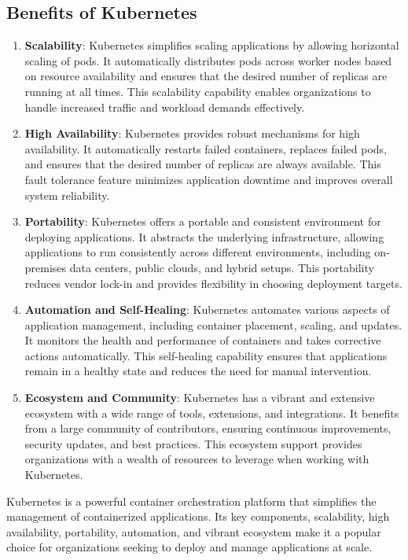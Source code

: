 \subsection*{Benefits of Kubernetes}
\begin{enumerate}

    \item \textbf{Scalability}: Kubernetes simplifies scaling applications by allowing horizontal scaling of pods. It automatically distributes pods across worker nodes based on resource availability and ensures that the desired number of replicas are running at all times. This scalability capability enables organizations to handle increased traffic and workload demands effectively.

    \item \textbf{High Availability}: Kubernetes provides robust mechanisms for high availability. It automatically restarts failed containers, replaces failed pods, and ensures that the desired number of replicas are always available. This fault tolerance feature minimizes application downtime and improves overall system reliability.

    \item \textbf{Portability}: Kubernetes offers a portable and consistent environment for deploying applications. It abstracts the underlying infrastructure, allowing applications to run consistently across different environments, including on-premises data centers, public clouds, and hybrid setups. This portability reduces vendor lock-in and provides flexibility in choosing deployment targets.

    \item \textbf{Automation and Self-Healing}: Kubernetes automates various aspects of application management, including container placement, scaling, and updates. It monitors the health and performance of containers and takes corrective actions automatically. This self-healing capability ensures that applications remain in a healthy state and reduces the need for manual intervention.

    \item \textbf{Ecosystem and Community}: Kubernetes has a vibrant and extensive ecosystem with a wide range of tools, extensions, and integrations. It benefits from a large community of contributors, ensuring continuous improvements, security updates, and best practices. This ecosystem support provides organizations with a wealth of resources to leverage when working with Kubernetes.

\end{enumerate}

Kubernetes is a powerful container orchestration platform that simplifies the management of containerized applications. Its key components, scalability, high availability, portability, automation, and vibrant ecosystem make it a popular choice for organizations seeking to deploy and manage applications at scale.